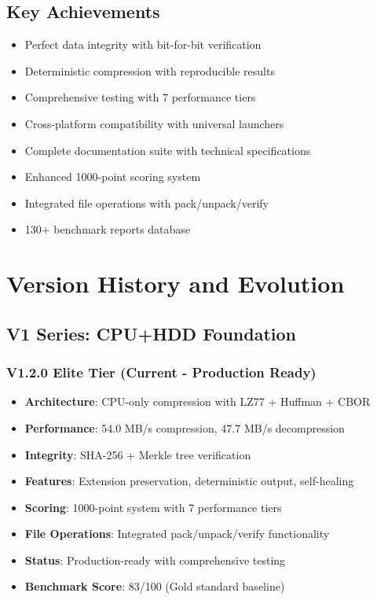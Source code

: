 \documentclass[12pt,a4paper]{article}
\begin{document}
\subsection{Key Achievements}
\begin{itemize}
    \item Perfect data integrity with bit-for-bit verification
    \item Deterministic compression with reproducible results
    \item Comprehensive testing with 7 performance tiers
    \item Cross-platform compatibility with universal launchers
    \item Complete documentation suite with technical specifications
    \item Enhanced 1000-point scoring system
    \item Integrated file operations with pack/unpack/verify
    \item 130+ benchmark reports database
\end{itemize}

\newpage

\section{Version History and Evolution}

\subsection{V1 Series: CPU+HDD Foundation}
\subsubsection{V1.2.0 Elite Tier (Current - Production Ready)}
\begin{itemize}
    \item \textbf{Architecture}: CPU-only compression with LZ77 + Huffman + CBOR
    \item \textbf{Performance}: 54.0 MB/s compression, 47.7 MB/s decompression
    \item \textbf{Integrity}: SHA-256 + Merkle tree verification
    \item \textbf{Features}: Extension preservation, deterministic output, self-healing
    \item \textbf{Scoring}: 1000-point system with 7 performance tiers
    \item \textbf{File Operations}: Integrated pack/unpack/verify functionality
    \item \textbf{Status}: Production-ready with comprehensive testing
    \item \textbf{Benchmark Score}: 83/100 (Gold standard baseline)
\end{itemize}
\end{document}
